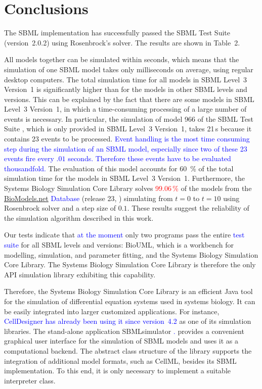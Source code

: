 \documentclass[10pt]{bmc_article}
\newenvironment{bmcformat}{\fussy\setboolean{publ}{true}}{\fussy}
\newcommand{\TODO}[1]{\textcolor{red}{#1}}
\newcommand{\COR}[1]{\textcolor{blue}{#1}}
\begin{document}
\begin{bmcformat}
\section*{Conclusions}
The \acs{SBML} implementation has successfully passed the
SBML Test Suite (version~2.0.2) using Rosenbrock's solver.
The results are shown in Table~2.

All models together can be simulated within seconds, which means that the simulation
of one \acs{SBML} model takes only milliseconds on average, using regular desktop computers.
The total simulation time for all models in \acs{SBML} Level~3 Version~1 is significantly
higher than for the models in other \acs{SBML} levels and versions.
This can be explained by the fact that there are some models in \acs{SBML} Level~3
Version~1, in which a time-consuming processing of a large number of events is
necessary.
In particular, the simulation of model 966 of the SBML Test Suite \COR{\cite{SBMLtestSuite2013}}, which is only provided in \acs{SBML} Level~3 Version~1, takes 21\,s because it contains 23 events to be processed.
\COR{Event handling is the most time consuming step during the simulation of an \acs{SBML} model, especially since two of these 23 events fire every $.01$ seconds.  Therefore these events
have to be evaluated thousandfold.} The evaluation of this model accounts for 60~\% of the total simulation time for the models in \acs{SBML} Level~3 Version~1. 
Furthermore, the Systems Biology Simulation Core Library solves \TODO{99.06\,\%} of the
models from the \href{http://biomodels.net}{BioModels.net} \COR{Database} (release 23,
\cite{Novere2006a}) simulating from $t = 0$ to $t = 10$ using Rosenbrock solver
and a step size of $0.1$.
These results suggest the reliability of the simulation algorithm described in
this work.

Our tests indicate that \COR{at the moment} only two programs pass the entire \COR{test suite} for all 
\acs{SBML} levels and versions: BioUML, which is a workbench for modelling, simulation,
and parameter fitting, and the Systems Biology Simulation Core Library.
The Systems Biology Simulation Core Library is therefore the only \acs{API} simulation
library exhibiting this capability.

Therefore, the Systems Biology Simulation Core Library is an efficient Java tool
for the simulation of differential equation systems used in systems biology.
It can be easily integrated into larger customized applications.
For instance, \COR{CellDesigner \cite{Funahashi2003} has already been using it since version~4.2} as
one of its simulation libraries.
The stand-alone application SBMLsimulator \COR{\cite{SBMLsimulator2013}.}
provides a convenient graphical user interface for the simulation of \acs{SBML}
models and uses it as a computational backend.
The abstract class structure of the library supports the integration of
additional model formats, such as CellML, besides its \acs{SBML} implementation. To
this end, it is only necessary to implement a suitable interpreter class.


\end{bmcformat}
\end{document}
